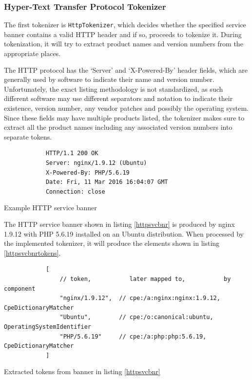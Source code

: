 \documentclass[a4paper,12pt]{article}
\begin{document}
\subsubsection{Hyper-Text Transfer Protocol Tokenizer}
 
	
	The first tokenizer is \texttt{HttpTokenizer}, which decides whether the specified service banner contains a valid HTTP header and if so, proceeds to tokenize it. During tokenization, it will try to extract product names and version numbers from the appropriate places.
	
	The HTTP protocol has the `Server' and `X-Powered-By' header fields, which are generally used by software to indicate their name and version number. Unfortunately, the exact listing methodology is not standardized, as such different software may use different separators and notation to indicate their existence, version number, any vendor patches and possibly the operating system. Since these fields may have multiple products listed, the tokenizer makes sure to extract all the product names including any associated version numbers into separate tokens.
	
	\begin{listing}[H]
		\begin{verbatim}
			HTTP/1.1 200 OK
			Server: nginx/1.9.12 (Ubuntu)
			X-Powered-By: PHP/5.6.19
			Date: Fri, 11 Mar 2016 16:04:07 GMT
			Connection: close
		\end{verbatim}
		\caption{Example HTTP service banner}
		\label{httpsvcbnr}
	\end{listing}
	
	The HTTP service banner shown in listing \ref{httpsvcbnr} is produced by nginx 1.9.12 with PHP 5.6.19 installed on an Ubuntu distribution. When processed by the implemented tokenizer, it will produce the elements shown in listing \ref{httpsvcbnrtokens}.
	
	\begin{listing}[H]
		\begin{verbatim}
			[
				// token,           later mapped to,           by component
				"nginx/1.9.12",  // cpe:/a:nginx:nginx:1.9.12, CpeDictionaryMatcher
				"Ubuntu",        // cpe:/o:canonical:ubuntu,   OperatingSystemIdentifier
				"PHP/5.6.19"     // cpe:/a:php:php:5.6.19,     CpeDictionaryMatcher
			]
		\end{verbatim}
		\caption{Extracted tokens from banner in listing \ref{httpsvcbnr}}
		\label{httpsvcbnrtokens}
	\end{listing}
	
\end{document}
